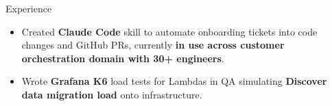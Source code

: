 \documentclass{resume} %
\begin{document}
\begin{workSection}{Experience}
\begin{itemize}
		\item Created \textbf{Claude Code} skill to automate onboarding tickets into code changes and GitHub PRs, currently \textbf{in use across customer orchestration domain with 30+ engineers}.
		\item Wrote \textbf{Grafana K6} load tests for Lambdas in QA simulating \textbf{Discover data migration load} onto infrastructure.
	\end{itemize}
	

\end{workSection}
\end{document}
